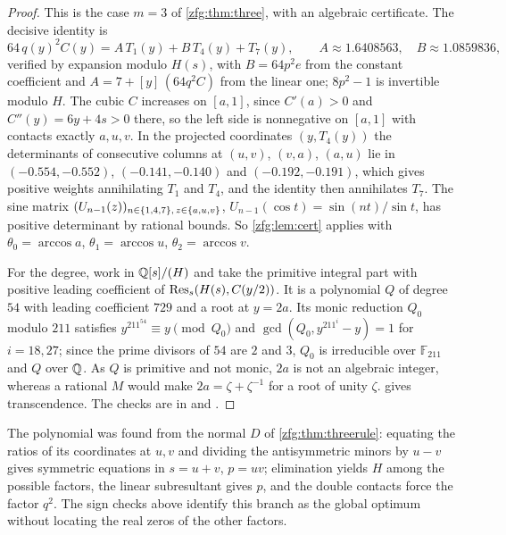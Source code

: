 \begin{proof}
This is the case $m=3$ of \cref{zfg:thm:three}, with an algebraic certificate. The decisive identity is
\[
 64\,q(y)^2C(y)=A\,T_1(y)+B\,T_4(y)+T_7(y),\qquad A\approx1.6408563,\quad B\approx1.0859836,
\]
verified by expansion modulo $H(s)$, with $B=64p^2e$ from the constant coefficient and $A=7+[y]\,(64q^2C)$ from the linear
one; $8p^2-1$ is invertible modulo $H$. The cubic $C$ increases on $[a,1]$, since $C'(a)>0$ and $C''(y)=6y+4s>0$ there, so
the left side is nonnegative on $[a,1]$ with contacts exactly $a,u,v$. In the projected coordinates $(y,T_4(y))$ the
determinants of consecutive columns at $(u,v)$, $(v,a)$, $(a,u)$ lie in $(-0.554,-0.552)$, $(-0.141,-0.140)$ and
$(-0.192,-0.191)$, which gives positive weights annihilating $T_1$ and $T_4$, and the identity then annihilates $T_7$. The
sine matrix $(U_{n-1}(z))_{n\in\{1,4,7\},\,z\in\{a,u,v\}}$, $U_{n-1}(\cos t)=\sin(nt)/\sin t$, has positive determinant by rational
bounds. So \cref{zfg:lem:cert} applies with $\theta_0=\arccos a$, $\theta_1=\arccos u$, $\theta_2=\arccos v$.

For the degree, work in $\mathbb{Q}[s]/(H)$ and take the primitive integral part with positive leading coefficient of
$\operatorname{Res}_s(H(s),C(y/2))$. It is a polynomial $Q$ of degree $54$ with leading coefficient $729$ and a root at $y=2a$. Its monic
reduction $Q_0$ modulo $211$ satisfies $y^{211^{54}}\equiv y\pmod{Q_0}$ and $\gcd(Q_0,y^{211^i}-y)=1$ for $i=18,27$; since the
prime divisors of $54$ are $2$ and $3$, $Q_0$ is irreducible over $\mathbb F_{211}$ and $Q$ over $\mathbb{Q}$. As $Q$ is primitive and
not monic, $2a$ is not an algebraic integer, whereas a rational $M$ would make $2a=\zeta+\zeta^{-1}$ for a root of unity
$\zeta$.  gives transcendence. The checks are in
 and .
\end{proof}

The polynomial was found from the normal $D$ of \cref{zfg:thm:threerule}: equating the ratios of its coordinates at $u,v$
and dividing the antisymmetric minors by $u-v$ gives symmetric equations in $s=u+v$, $p=uv$; elimination yields $H$
among the possible factors, the linear subresultant gives $p$, and the double contacts force the factor $q^2$. The sign
checks above identify this branch as the global optimum without locating the real zeros of the other factors.

